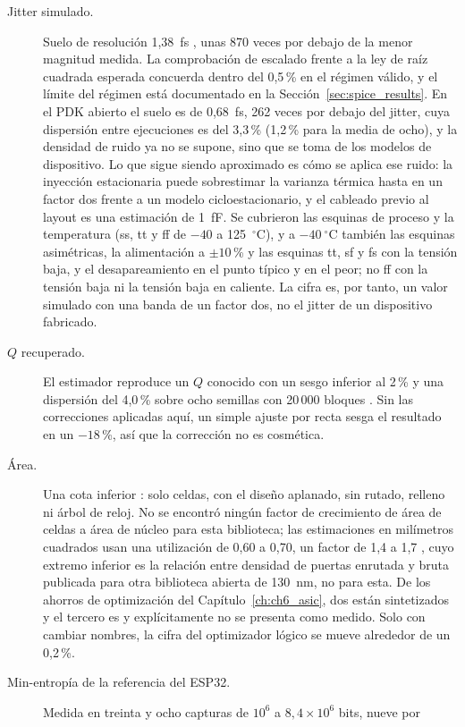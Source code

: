 \begin{description}
\item[Jitter simulado.] Suelo de resolución 1,38~fs \simu{}, unas 870 veces
por debajo de la menor magnitud medida. La comprobación de escalado frente
a la ley de raíz cuadrada esperada concuerda dentro del 0,5\,\% en el
régimen válido, y el límite del régimen está documentado en la
Sección~\ref{sec:spice_results}. En el \ac{PDK} abierto el suelo es de
0,68~fs, 262 veces por debajo del jitter, cuya dispersión entre
ejecuciones es del 3,3\,\% (1,2\,\% para la media de ocho), y la densidad
de ruido ya no se
supone, sino que se toma de los modelos de dispositivo. Lo que sigue siendo
aproximado es cómo se aplica ese ruido: la inyección estacionaria puede
sobrestimar la varianza térmica hasta en un factor dos frente a un modelo
cicloestacionario, y el cableado previo al layout es una estimación de
1~fF. Se cubrieron las esquinas de proceso y la temperatura (ss, tt y ff
de $-40$ a 125~$^\circ$C), y a $-40~^\circ$C también las esquinas
asimétricas, la alimentación a $\pm10$\,\% y las esquinas tt, sf y fs
con la tensión baja, y el desapareamiento en el punto típico y en el
peor; no ff con la tensión baja ni la tensión baja en caliente. La cifra es, por tanto, un valor simulado con una banda de un factor
dos, no el jitter de un dispositivo fabricado.
\item[$Q$ recuperado.] El estimador reproduce un $Q$ conocido con un sesgo
inferior al 2\,\% y una dispersión del 4,0\,\% sobre ocho semillas con
20\,000 bloques \simu{}. Sin las correcciones aplicadas aquí, un simple
ajuste por recta sesga el resultado en un $-18$\,\%, así que la corrección
no es cosmética.
\item[Área.] Una cota inferior \simu{}: solo celdas, con el diseño aplanado,
sin rutado, relleno ni árbol de reloj. No se encontró ningún factor de
crecimiento de área de celdas a área de núcleo para esta biblioteca; las
estimaciones en milímetros cuadrados usan una utilización de 0,60 a
0,70, un factor de 1,4 a 1,7 \est{}, cuyo extremo inferior es la relación
entre densidad de puertas enrutada y bruta publicada para otra
biblioteca abierta de 130~nm, no para esta. De los ahorros de optimización del
Capítulo~\ref{ch:ch6_asic}, dos están sintetizados y el tercero es
\est{} y explícitamente no se presenta como medido. Solo con cambiar
nombres, la cifra del optimizador lógico se mueve alrededor de un
0,2\,\%.
\item[Min-entropía de la referencia del ESP32.] Medida \meas{} en
treinta y ocho capturas de $10^6$ a $8{,}4\times10^6$ bits, nueve por

\end{description}

